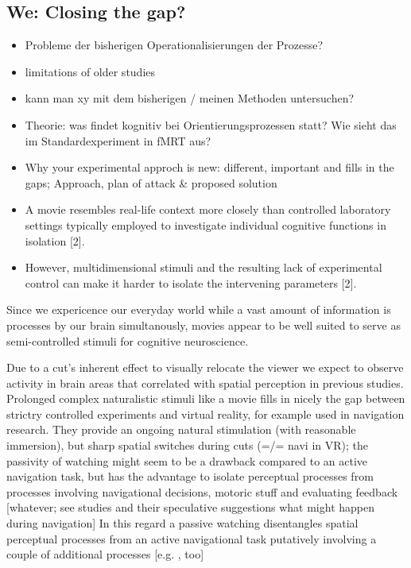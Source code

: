 \documentclass[10pt,a4paper,twocolumn]{article}
\begin{document}
\subsection{We: Closing the gap?}
\begin{itemize}
	\item Probleme der bisherigen Operationalisierungen der Prozesse? 
	\item limitations of older studies
	\item kann man xy mit dem bisherigen / meinen Methoden untersuchen?
	\item Theorie: was findet kognitiv bei Orientierungsprozessen statt? Wie
	sieht das im Standardexperiment in fMRT aus?
	\item Why your experimental approch is new: different, important and fills
	in the gaps; Approach, plan of attack \& proposed solution
	\item A movie resembles real-life context more closely than controlled laboratory
	settings typically employed to investigate individual cognitive functions
	in isolation {[}2{]}\citep{labs_2015_portrayed_emos_in_Forrest}. 
	\item However, multidimensional stimuli and the resulting lack of experimental
	control can make it harder to isolate the intervening parameters {[}2{]}.
	\citep{labs_2015_portrayed_emos_in_Forrest}
\end{itemize}
Since we expericence our everyday world while a vast amount of information
is processes by our brain simultanously, movies appear to be well
suited to serve as semi-controlled stimuli for cognitive neuroscience. 

Due to a cut's inherent effect to visually relocate the viewer we
expect to observe activity in brain areas that correlated with spatial
perception in previous studies. Prolonged complex naturalistic stimuli
like a movie fills in nicely the gap between strictry controlled experiments
and virtual reality, for example used in navigation research. They
provide an ongoing natural stimulation (with reasonable immersion),
but sharp spatial switches during cuts (=/= navi in VR); the passivity
of watching might seem to be a drawback compared to an active navigation
task, but has the advantage to isolate perceptual processes from processes
involving navigational decisions, motoric stuff and evaluating feedback
{[}whatever; see studies and their speculative suggestions what might
happen during navigation{]} In this regard a passive watching disentangles
spatial perceptual processes from an active navigational task putatively
involving a couple of additional processes {[}e.g. \citep{chrastil_2013_framework_spatial_navi,taube_2013_navigation_in_VR},
too{]}
\end{document}
